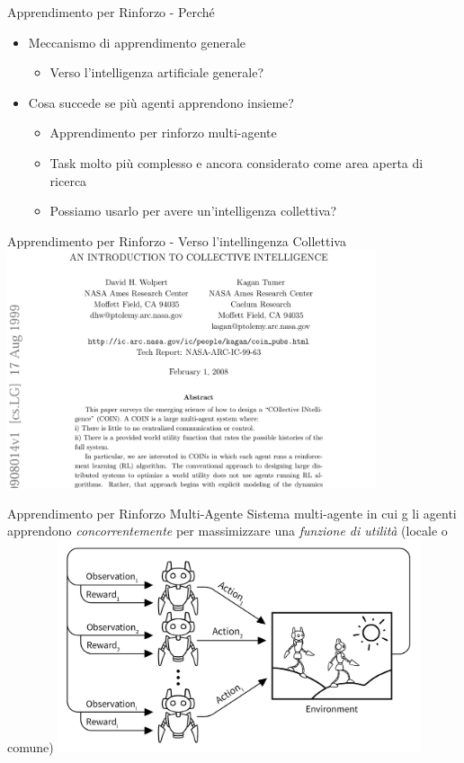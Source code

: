 \documentclass[presentation, 10pt,aspectratio=169]{beamer}\mode<presentation>{\usetheme{AMSBolognaFC}}
\begin{document}
\begin{frame}{Apprendimento per Rinforzo - Perché}
	\begin{itemize}
		\item Meccanismo di apprendimento \alert{generale}
		\begin{itemize}
			\item Verso l'intelligenza artificiale generale?
		\end{itemize}
		\item Cosa succede se più agenti apprendono insieme?
		\begin{itemize}
			\item Apprendimento per rinforzo multi-agente
			\item Task molto più complesso e ancora considerato come area aperta di ricerca
			\item Possiamo usarlo per avere un'intelligenza collettiva?
		\end{itemize}
	\end{itemize}
\end{frame}
\begin{frame}{Apprendimento per Rinforzo - Verso l'intellingenza Collettiva}
	\centering
	\includegraphics[height=7cm]{img/COIN.png}
\end{frame}
\begin{frame}{Apprendimento per Rinforzo Multi-Agente}
	Sistema multi-agente in cui g	li agenti apprendono \emph{concorrentemente} per massimizzare una \emph{funzione di utilità} (locale o comune)
	\centering
	\includegraphics[width=0.8\textwidth]{img/marl.png}
\end{frame}
\end{document}

